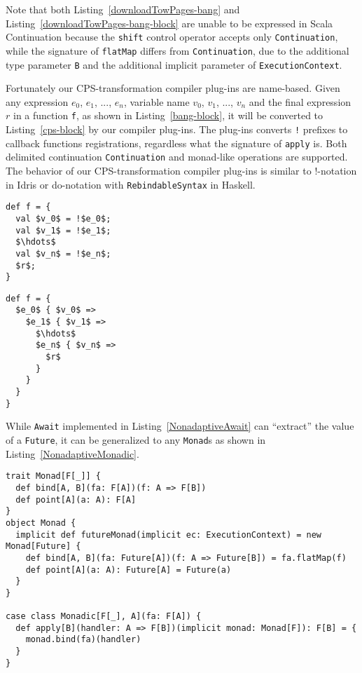 Note that both Listing~\ref{downloadTowPages-bang} and Listing~\ref{downloadTowPages-bang-block} are unable to be expressed in Scala Continuation because the \lstinline{shift} control operator accepts only \lstinline{Continuation}, while the signature of \lstinline{flatMap} differs from \lstinline{Continuation}, due to the additional type parameter \lstinline{B} and the additional implicit parameter of \lstinline{ExecutionContext}.

Fortunately our CPS-transformation compiler plug-ins are name-based. Given any expression $e_0$, $e_1$, ..., $e_n$, variable name $v_0$, $v_1$, ..., $v_n$ and the final expression $r$ in a function \lstinline{f}, as shown in Listing~\ref{bang-block}, it will be converted to Listing~\ref{cps-block} by our compiler plug-ins. The plug-ins converts \lstinline{!} prefixes to callback functions registrations, regardless what the signature of \lstinline{apply} is. Both delimited continuation \lstinline{Continuation} and monad-like operations are supported. The behavior of our CPS-transformation compiler plug-ins is similar to !-notation in Idris or do-notation with \lstinline{RebindableSyntax} in Haskell.

\begin{lstlisting}[mathescape=true, caption={A function with !-notation}, label={bang-block}]
def f = {
  val $v_0$ = !$e_0$;
  val $v_1$ = !$e_1$;
  $\hdots$
  val $v_n$ = !$e_n$;
  $r$;
}
\end{lstlisting}

\begin{lstlisting}[mathescape=true,caption={The code converted from !-notation by our name-based CPS-transformation plug-ins}, label={cps-block}]
def f = {
  $e_0$ { $v_0$ =>
    $e_1$ { $v_1$ =>
      $\hdots$
      $e_n$ { $v_n$ =>
        $r$
      }
    }
  }
}
\end{lstlisting}

While \lstinline{Await} implemented in Listing~\ref{NonadaptiveAwait} can ``extract'' the value of a \lstinline{Future}, it can be generalized to any \lstinline{Monad}s as shown in Listing~\ref{NonadaptiveMonadic}.

\begin{lstlisting}[caption={Implementing \lstinline{Monadic} LDK as a forwarder to \lstinline{Monad}},label={NonadaptiveMonadic}]
trait Monad[F[_]] {
  def bind[A, B](fa: F[A])(f: A => F[B])
  def point[A](a: A): F[A]
}
object Monad {
  implicit def futureMonad(implicit ec: ExecutionContext) = new Monad[Future] {
    def bind[A, B](fa: Future[A])(f: A => Future[B]) = fa.flatMap(f)
    def point[A](a: A): Future[A] = Future(a)
  }
}

case class Monadic[F[_], A](fa: F[A]) {
  def apply[B](handler: A => F[B])(implicit monad: Monad[F]): F[B] = {
    monad.bind(fa)(handler)
  }
}
\end{lstlisting}

